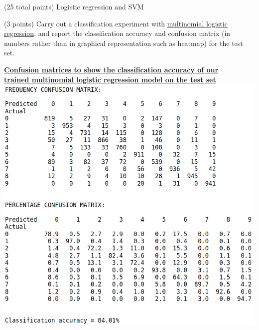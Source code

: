 \documentclass[12pt]{article}
\begin{document}
\begin{question}{(25 total points) Logistic regression and SVM}

  


  \medskip
   \begin{subquestion}{(3 points)
       Carry out a classification experiment with
       \href{https://scikit-learn.org/0.19/modules/generated/sklearn.linear\_model.LogisticRegression.html}{multinomial logistic regression},
       and report the classification accuracy and confusion matrix (in
       numbers rather than in graphical representation such as heatmap)
       for the test set.
     } \label{Q2.1}


   

      \begin{answerbox}{40em}
        \begin{center}
        \textbf{\underline{\large{Confusion matrices to show the classification accuracy of our}}}\\
        \textbf{\underline{\large{trained multinomial logistic regression model on the test set}}}
        \vspace{0.3cm}\\
         \includegraphics[width=1\textwidth]{images/q21.png}
        \end{center}
      \end{answerbox}
  



\end{subquestion}
\end{question}
\end{document}
